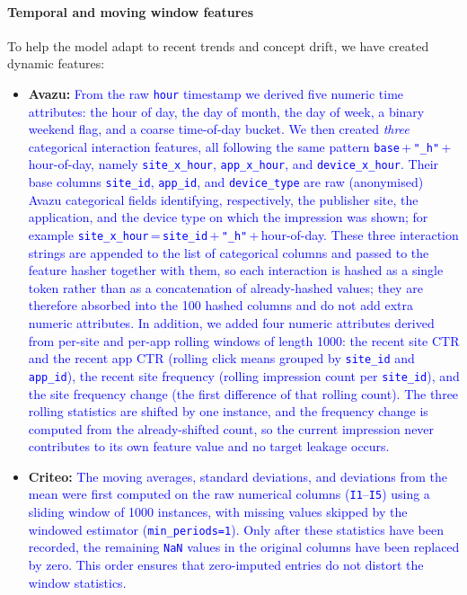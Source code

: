 \documentclass[12pt]{article}
\newcommand{\new}[1]{\textcolor{blue}{#1}}
\begin{document}
\paragraph{Temporal and moving window features}
To help the model adapt to recent trends and concept drift, we have created dynamic features:
\begin{itemize}
    \item \textbf{Avazu:} \new{From the raw \texttt{hour} timestamp we derived five numeric time attributes: the hour of day, the day of month, the day of week, a binary weekend flag, and a coarse time-of-day bucket. We then created \emph{three} categorical interaction features, all following the same pattern \texttt{base}\,+\,\texttt{"\_h"}\,+\,hour-of-day, namely \texttt{site\_x\_hour}, \texttt{app\_x\_hour}, and \texttt{device\_x\_hour}. Their base columns \texttt{site\_id}, \texttt{app\_id}, and \texttt{device\_type} are raw (anonymised) Avazu categorical fields identifying, respectively, the publisher site, the application, and the device type on which the impression was shown; for example \texttt{site\_x\_hour}\,=\,\texttt{site\_id}\,+\,\texttt{"\_h"}\,+\,hour-of-day. These three interaction strings are appended to the list of categorical columns and passed to the feature hasher together with them, so each interaction is hashed as a single token rather than as a concatenation of already-hashed values; they are therefore absorbed into the 100 hashed columns and do not add extra numeric attributes. In addition, we added four numeric attributes derived from per-site and per-app rolling windows of length 1000: the recent site CTR and the recent app CTR (rolling click means grouped by \texttt{site\_id} and \texttt{app\_id}), the recent site frequency (rolling impression count per \texttt{site\_id}), and the site frequency change (the first difference of that rolling count). The three rolling statistics are shifted by one instance, and the frequency change is computed from the already-shifted count, so the current impression never contributes to its own feature value and no target leakage occurs.}
    \item \textbf{Criteo:} \new{The moving averages, standard deviations, and deviations from the mean were first computed on the raw numerical columns (\texttt{I1}--\texttt{I5}) using a sliding window of 1000 instances, with missing values skipped by the windowed estimator (\texttt{min\_periods=1}). Only after these statistics have been recorded, the remaining \texttt{NaN} values in the original columns have been replaced by zero. This order ensures that zero-imputed entries do not distort the window statistics.}
\end{itemize}
\end{document}
